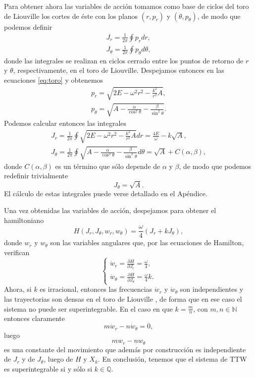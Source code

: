 \documentclass[12pt,a4paper,twoside]{article}
\theoremstyle{definition} \newtheorem{defn}[thm]{Definición}
\theoremstyle{definition} \newtheorem{ejemplo}[thm]{Ejemplo}
\theoremstyle{definition} \newtheorem{ejercicio}[thm]{Ejercicio}
\theoremstyle{remark} \newtheorem*{obs}{Observación}
\def\QQ{\mathbb{Q}}
\def\NN{\mathbb{N}}
\begin{document}
Para obtener ahora las variables de acción tomamos como base de ciclos del toro de Liouville los cortes de éste con los planos $(r,p_r)$ y $(\theta,p_{\theta})$, de modo que podemos definir
\begin{align}
    J_r=\frac{1}{2\pi}\oint p_r dr, \\
    J_\theta=\frac{1}{2\pi}\oint p_{\theta}d\theta,
\end{align}
donde las integrales se realizan en ciclos cerrado entre los puntos de retorno de $r$ y $\theta$, respectivamente, en el toro de Liouville.
Despejamos entonces en las ecuaciones \eqref{eq:toro} y obtenemos
\begin{align}
    p_r=\sqrt{2E-\omega^2r^2-\frac{k^2}{r^2}A}, \\
    p_{\theta}=\sqrt{A-\frac{\alpha}{\cos^2\theta} -\frac{\beta}{\sin^2\theta}}.
\end{align}
Podemos calcular entonces las integrales
\begin{align}
  J_r=\frac{1}{2\pi}\oint \sqrt{2E-\omega^2r^2-\frac{k^2}{r^2}A} dr=\frac{4E}{\omega}-k\sqrt{A}, \label{eq:intaccion1} \\ 
  J_\theta=\frac{1}{2\pi}\oint \sqrt{A-\frac{\alpha}{\cos^2\theta} -\frac{\beta}{\sin^2\theta}}d\theta=\sqrt{A}+C(\alpha,\beta), 
\label{eq:intaccion2}
\end{align}
donde $C(\alpha,\beta)$ es un término que sólo depende de $\alpha$ y $\beta$, de modo que podemos redefinir trivialmente 
\begin{equation}
  J_{\theta}=\sqrt{A}. 
\end{equation}
El cálculo de estas integrales puede verse detallado en el Apéndice.

Una vez obtenidas las variables de acción, despejamos para obtener el hamiltoniano
\begin{equation}
  H(J_r,J_\theta,w_r,w_\theta)=\frac{\omega}{4}(J_r+kJ_\theta),
\end{equation}
donde $w_r$ y $w_\theta$ son las variables angulares que, por las ecuaciones de Hamilton, verifican
\begin{equation}
  \begin{cases}
    \dot{w}_r=\frac{\partial H}{\partial J_r}=\frac{\omega}{4}, \\ 
    \dot{w}_{\theta}=\frac{\partial H}{\partial J_\theta}=\frac{\omega}{4} k.
  \end{cases}
\end{equation}
Ahora, si $k$ es irracional, entonces las frecuencias $\dot{w}_r$ y $\dot{w}_\theta$ son independientes y las trayectorias son densas en el toro de Liouville \cite{arnold}, de forma que en ese caso el sistema no puede ser superintegrable. En el caso en que $k=\frac{m}{n}$, con $m,n \in \NN$ entonces claramente
\begin{equation*}
  m\dot{w}_r-n\dot{w}_\theta=0,
\end{equation*}
luego 
\begin{equation}
  mw_r-nw_\theta
\end{equation}
es una constante del movimiento que además por construcción es independiente de $J_r$ y de $J_\theta$, luego de $H$ y $X_k$. En conclusión, tenemos que el sistema de TTW es superintegrable si y sólo si $k\in \QQ$.
\end{document}
